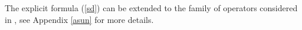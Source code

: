 \documentclass[a4paper,11pt]{article}
\theoremstyle{definition}
\newcommand{\ri}{{\rm i}}
\newcommand{\be}{\begin{equation}}
\newcommand{\ee}{\end{equation}}
\newcommand{\ba}{\begin{aligned}}
\newcommand{\ea}{\end{aligned}}
\begin{document}

The explicit formula (\ref{sd}) can be extended to the family of operators considered in \cite{gm3}, see Appendix \ref{asun} for more details. 
\end{document}
